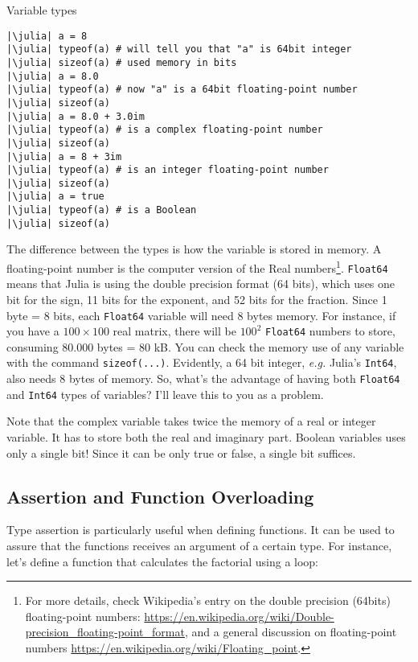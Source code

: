 \begin{example}{Variable types}
\begin{verbatim}
|\julia| a = 8 
|\julia| typeof(a) # will tell you that "a" is 64bit integer
|\julia| sizeof(a) # used memory in bits
|\julia| a = 8.0
|\julia| typeof(a) # now "a" is a 64bit floating-point number
|\julia| sizeof(a)
|\julia| a = 8.0 + 3.0im
|\julia| typeof(a) # is a complex floating-point number
|\julia| sizeof(a)
|\julia| a = 8 + 3im
|\julia| typeof(a) # is an integer floating-point number
|\julia| sizeof(a)
|\julia| a = true
|\julia| typeof(a) # is a Boolean
|\julia| sizeof(a)
\end{verbatim}
\end{example}

The difference between the types is how the variable is stored in memory. A floating-point number is the computer version of the Real numbers\footnote{For more details, check Wikipedia's entry on the double precision (64bits) floating-point numbers: \url{https://en.wikipedia.org/wiki/Double-precision_floating-point_format}, and a general discussion on floating-point numbers \url{https://en.wikipedia.org/wiki/Floating_point}.}. \texttt{Float64} means that Julia is using the double precision format (64 bits), which uses one bit for the sign, 11 bits for the exponent, and 52 bits for the fraction. Since 1 byte = 8 bits, each \texttt{Float64} variable will need 8 bytes memory. For instance, if you have a $100\times 100$ real matrix, there will be $100^2$ \texttt{Float64} numbers to store, consuming 80.000 bytes = 80 kB. 
You can check the memory use of any variable with the command \texttt{sizeof(...)}.
Evidently, a 64 bit integer, \textit{e.g.} Julia's \texttt{Int64}, also needs 8 bytes of memory. So, what's the advantage of having both \texttt{Float64} and \texttt{Int64} types of variables? I'll leave this to you as a problem.

Note that the complex variable takes twice the memory of a real or integer variable. It has to store both the real and imaginary part. Boolean variables uses only a single bit! Since it can be only true or false, a single bit suffices.

\subsection{Assertion and Function Overloading}

Type assertion is particularly useful when defining functions. It can be used to assure that the functions receives an argument of a certain type. For instance, let's define a function that calculates the factorial using a loop:

